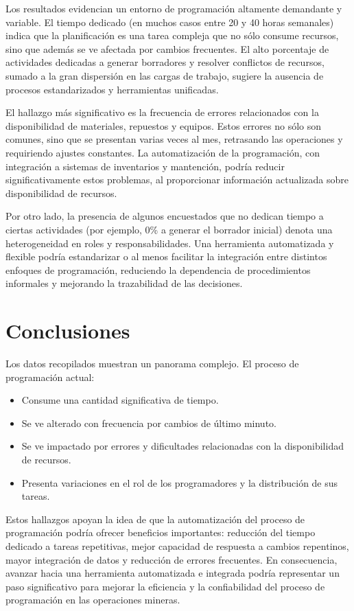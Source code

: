 \documentclass{article}
\begin{document}
Los resultados evidencian un entorno de programación altamente demandante y variable. El tiempo dedicado (en muchos casos entre 20 y 40 horas semanales) indica que la planificación es una tarea compleja que no sólo consume recursos, sino que además se ve afectada por cambios frecuentes. El alto porcentaje de actividades dedicadas a generar borradores y resolver conflictos de recursos, sumado a la gran dispersión en las cargas de trabajo, sugiere la ausencia de procesos estandarizados y herramientas unificadas.

El hallazgo más significativo es la frecuencia de errores relacionados con la disponibilidad de materiales, repuestos y equipos. Estos errores no sólo son comunes, sino que se presentan varias veces al mes, retrasando las operaciones y requiriendo ajustes constantes. La automatización de la programación, con integración a sistemas de inventarios y mantención, podría reducir significativamente estos problemas, al proporcionar información actualizada sobre disponibilidad de recursos.

Por otro lado, la presencia de algunos encuestados que no dedican tiempo a ciertas actividades (por ejemplo, 0\% a generar el borrador inicial) denota una heterogeneidad en roles y responsabilidades. Una herramienta automatizada y flexible podría estandarizar o al menos facilitar la integración entre distintos enfoques de programación, reduciendo la dependencia de procedimientos informales y mejorando la trazabilidad de las decisiones.

\section*{Conclusiones}

Los datos recopilados muestran un panorama complejo. El proceso de programación actual:

\begin{itemize}
    \item Consume una cantidad significativa de tiempo.
    \item Se ve alterado con frecuencia por cambios de último minuto.
    \item Se ve impactado por errores y dificultades relacionadas con la disponibilidad de recursos.
    \item Presenta variaciones en el rol de los programadores y la distribución de sus tareas.
\end{itemize}

Estos hallazgos apoyan la idea de que la automatización del proceso de programación podría ofrecer beneficios importantes: reducción del tiempo dedicado a tareas repetitivas, mejor capacidad de respuesta a cambios repentinos, mayor integración de datos y reducción de errores frecuentes. En consecuencia, avanzar hacia una herramienta automatizada e integrada podría representar un paso significativo para mejorar la eficiencia y la confiabilidad del proceso de programación en las operaciones mineras.
\end{document}
